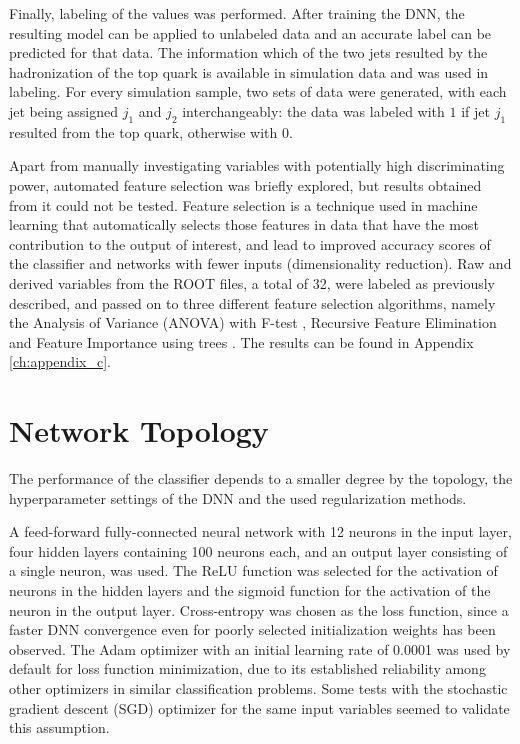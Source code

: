 Finally, labeling of the values was performed. After training the DNN, the resulting model can be applied to unlabeled data and an accurate label can be predicted for that data. The information which of the two jets resulted by the hadronization of the top quark is available in simulation data and was used in labeling. For every simulation sample, two sets of data were generated, with each jet being assigned $j_1$ and $j_2$ interchangeably: the data was labeled with $1$ if jet $j_1$ resulted from the top quark, otherwise with $0$.

Apart from manually investigating variables with potentially high discriminating power, automated feature selection was briefly explored, but results obtained from it could not be tested. Feature selection is a technique used in machine learning that automatically selects those features in data that have the most contribution to the output of interest, and lead to improved accuracy scores of the classifier and networks with fewer inputs (dimensionality reduction). Raw and derived variables from the ROOT files, a total of 32, were labeled as previously described, and passed on to three different feature selection algorithms, namely the Analysis of Variance (ANOVA) with F-test \cite{misc:anova}, Recursive Feature Elimination \cite{scikit-learn} and Feature Importance using trees \cite{scikit-learn}. The results can be found in Appendix \ref{ch:appendix_c}.

\section{Network Topology}
\label{sec:ch-4-network}

The performance of the classifier depends to a smaller degree by the topology, the hyperparameter settings of the DNN and the used regularization methods.

A feed-forward fully-connected neural network with 12 neurons in the input layer, four hidden layers containing 100 neurons each, and an output layer consisting of a single neuron, was used. The ReLU function was selected for the activation of neurons in the hidden layers and the sigmoid function for the activation of the neuron in the output layer. Cross-entropy was chosen as the loss function, since a faster DNN convergence even for poorly selected initialization weights has been observed. The Adam optimizer with an initial learning rate of 0.0001 was used by default for loss function minimization, due to its established reliability among other optimizers in similar classification problems. Some tests with the stochastic gradient descent (SGD) optimizer for the same input variables seemed to validate this assumption.


